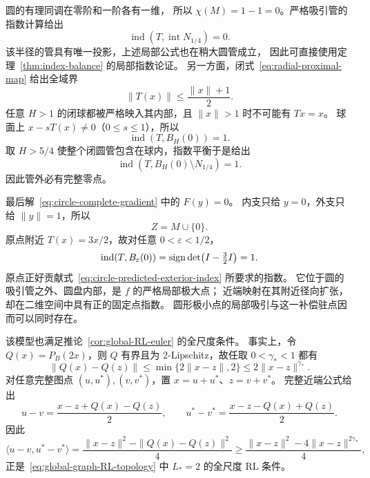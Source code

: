 圆的有理同调在零阶和一阶各有一维，
所以 $\chi(M)=1-1=0$。严格吸引管的指数计算给出
\[
 \operatorname{ind}(T,\operatorname{int}N_{1/4})=0.
\]
该半径的管具有唯一投影，上述局部公式也在稍大圆管成立，
因此可直接使用定理~\ref{thm:index-balance} 的局部指数论证。
另一方面，闭式~\eqref{eq:radial-proximal-map} 给出全域界
\[
 \|T(x)\|\le\frac{\|x\|+1}{2}.
\]
任意 $H>1$ 的闭球都被严格映入其内部，且 $\|x\|>1$ 时不可能有 $Tx=x$。
球面上 $x-sT(x)\ne0$（$0\le s\le1$），所以
\[
 \operatorname{ind}(T,B_H(0))=1.
\]
取 $H>5/4$ 使整个闭圆管包含在球内，指数平衡于是给出
\begin{equation}
\label{eq:circle-predicted-exterior-index}
 \operatorname{ind}(T,B_H(0)\setminus N_{1/4})=1.
\end{equation}
因此管外必有完整零点。

最后解~\eqref{eq:circle-complete-gradient} 中的 $F(y)=0$。
内支只给 $y=0$，外支只给 $\|y\|=1$，所以
\begin{equation}
\label{eq:circle-complete-zero-set}
 Z=M\cup\{0\}.
\end{equation}
原点附近 $T(x)=3x/2$，故对任意 $0<\varepsilon<1/2$，
\[
 \operatorname{ind}(T,B_\varepsilon(0))
 =\operatorname{sign}\det\bigl(I-\tfrac32I\bigr)=1.
\]
原点正好贡献式~\eqref{eq:circle-predicted-exterior-index} 所要求的指数。
它位于圆的吸引管之外、圆盘内部，是 $f$ 的严格局部极大点；
近端映射在其附近径向扩张，却在二维空间中具有正的固定点指数。
圆形极小点的局部吸引与这一补偿驻点因而可以同时存在。

该模型也满足推论~\ref{cor:global-RL-euler} 的全尺度条件。
事实上，令 $Q(x)=P_B(2x)$，则 $Q$ 有界且为 $2$-Lipschitz，故任取
$0<\gamma_*<1$ 都有
\[
 \|Q(x)-Q(z)\|
 \le\min\{2\|x-z\|,2\}
 \le2\|x-z\|^{\gamma_*}.
\]
对任意完整图点 $(u,u^*),(v,v^*)$，置 $x=u+u^*$、$z=v+v^*$。
完整近端公式给出
\[
 u-v=\frac{x-z+Q(x)-Q(z)}2,\qquad
 u^*-v^*=\frac{x-z-Q(x)+Q(z)}2.
\]
因此
\[
 \langle u-v,u^*-v^*\rangle
 =\frac{\|x-z\|^2-\|Q(x)-Q(z)\|^2}{4}
 \ge\frac{\|x-z\|^2-4\|x-z\|^{2\gamma_*}}4,
\]
正是~\eqref{eq:global-graph-RL-topology} 中 $L_*=2$ 的全尺度 RL 条件。
